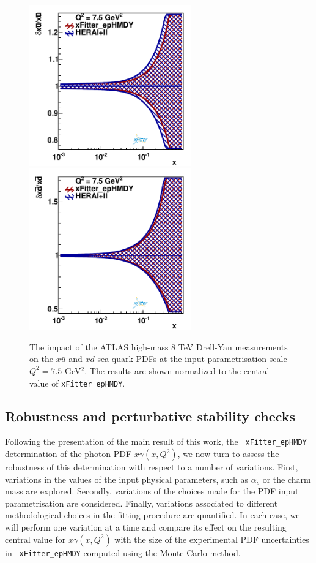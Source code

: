 \begin{figure}[t]
\centering
\includegraphics[width=7cm]{figs/q2_7_5_pdf_ubar_ratio.pdf}
\includegraphics[width=7cm]{figs/q2_7_5_pdf_dbar_ratio.pdf} 
\caption{The impact of the ATLAS high-mass 8 TeV Drell-Yan measurements
  on the $x\bar{u}$ and $x\bar{d}$ sea quark PDFs at the input
  parametrisation scale $Q^2=7.5$ GeV$^2$.
  The results are shown normalized to the central value of {\tt xFitter\_epHMDY}. 
  }
\label{fig:QCDfit}
\end{figure}

\subsection{Robustness and perturbative stability checks}
\label{sec:crosschecks}

Following the presentation of the main result of this work, the {\tt
  xFitter\_epHMDY} determination of the
photon PDF $x\gamma(x,Q^2)$, we now turn to assess the robustness of this determination
with respect to a number of variations.
%
First, variations in the values of the input
physical parameters, such as $\alpha_s$ or the charm mass are explored.
%
Secondly, variations of the choices made for the PDF input parametrisation
are considered.
%
Finally,
variations associated to different methodological choices in
the fitting procedure are quantified.
%
In each case, we will perform one variation at a time
and compare its effect on the resulting central value
for $x\gamma(x,Q^2)$ with the size of the experimental PDF
uncertainties in {\tt
  xFitter\_epHMDY} computed using the Monte Carlo method.

